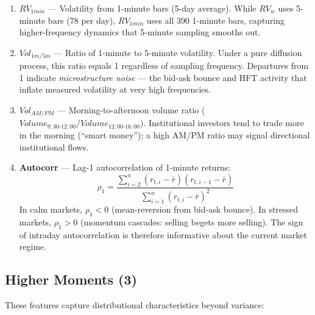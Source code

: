 \documentclass[11pt,a4paper]{article}
\begin{document}
\begin{enumerate}
    \item \textbf{$RV_{1min}$} --- Volatility from 1-minute bars (5-day average). While $RV_w$ uses 5-minute bars (78 per day), $RV_{1min}$ uses all 390 1-minute bars, capturing higher-frequency dynamics that 5-minute sampling smooths out.

    \item \textbf{$Vol_{1m/5m}$} --- Ratio of 1-minute to 5-minute volatility. Under a pure diffusion process, this ratio equals 1 regardless of sampling frequency. Departures from 1 indicate \textit{microstructure noise} --- the bid-ask bounce and HFT activity that inflate measured volatility at very high frequencies.

    \item \textbf{$Vol_{AM/PM}$} --- Morning-to-afternoon volume ratio ($Volume_{9:30\text{-}12:00} / Volume_{12:00\text{-}16:00}$). Institutional investors tend to trade more in the morning (``smart money''); a high AM/PM ratio may signal directional institutional flows.

    \item \textbf{Autocorr} --- Lag-1 autocorrelation of 1-minute returns:
    \begin{equation}
        \rho_1 = \frac{\sum_{i=2}^{n}(r_{t,i} - \bar{r})(r_{t,i-1} - \bar{r})}{\sum_{i=1}^{n}(r_{t,i} - \bar{r})^2}
    \end{equation}
    In calm markets, $\rho_1 < 0$ (mean-reversion from bid-ask bounce). In stressed markets, $\rho_1 > 0$ (momentum cascades: selling begets more selling). The sign of intraday autocorrelation is therefore informative about the current market regime.
\end{enumerate}

\subsection{Higher Moments (3)}

These features capture distributional characteristics beyond variance:
\end{document}
